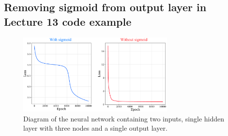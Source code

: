 \subsection{Removing sigmoid from output layer in Lecture 13 code example}

\begin{figure}[!ht]
  \centering
  \includegraphics[width=0.7\textwidth]{figures/lecture13_loss_compared.pdf}
  \caption{Diagram of the neural network containing two inputs, single hidden layer with three nodes and a single output layer.}
  \label{q1_network_diagram}
\end{figure}



